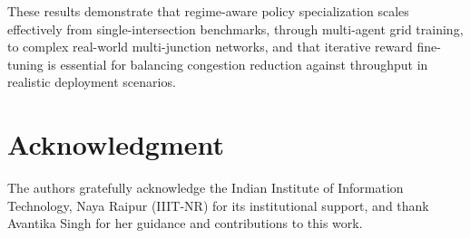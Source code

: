 \documentclass[lettersize,journal]{IEEEtran}
\begin{document}
These results demonstrate that regime-aware policy specialization scales
effectively from single-intersection benchmarks, through multi-agent grid
training, to complex real-world multi-junction networks, and that
iterative reward fine-tuning is essential for balancing congestion
reduction against throughput in realistic deployment scenarios.

\section*{Acknowledgment}

The authors gratefully acknowledge the Indian Institute of Information
Technology, Naya Raipur (IIIT-NR) for its institutional support, and thank
Avantika Singh for her guidance and contributions to this work.
\end{document}

